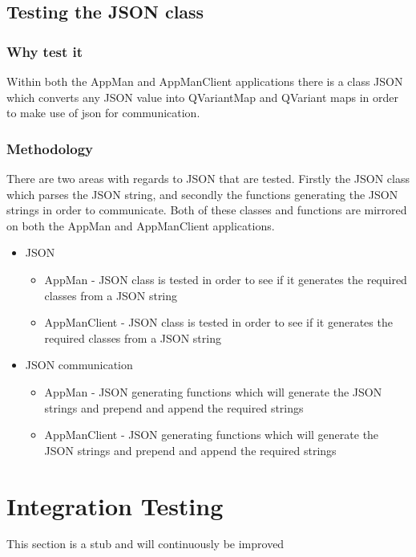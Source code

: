 \documentclass[a4paper,12pt,final]{article}
\begin{document}
\subsection{Testing the JSON class}
\subsubsection{Why test it}
Within both the AppMan and AppManClient applications there is a class JSON which converts any JSON value into QVariantMap and QVariant maps in order to make use of json for communication.
\subsubsection{Methodology}
There are two areas with regards to JSON that are tested. Firstly the JSON class which parses the JSON string, and secondly the functions generating the JSON strings in order to communicate. Both of these classes and functions are mirrored on both the AppMan and AppManClient applications.
\begin{itemize}
\item JSON

\begin{itemize}
\item AppMan - JSON class is tested in order to see if it generates the required classes from a JSON string
\item AppManClient - JSON class is tested in order to see if it generates the required classes from a JSON string
\end{itemize}

\item JSON communication
\begin{itemize}
\item AppMan - JSON generating functions which will generate the JSON strings and prepend and append the required strings
\item AppManClient - JSON generating functions which will generate the JSON strings and prepend and append the required strings
\end{itemize}

\end{itemize}







\section{Integration Testing}
This section is a stub and will continuously be improved
\end{document}
